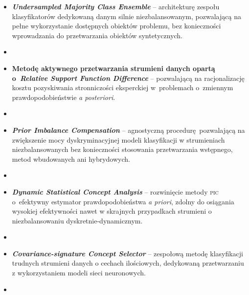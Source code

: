 \begin{itemize}
	\item \textbf{\emph{Undersampled Majority Class Ensemble}} -- architekturę zespołu klasyfikatorów dedykowaną danym silnie niezbalansowanym, pozwalającą na pełne wykorzystanie dostępnych obiektów problemu, bez konieczności wprowadzania do przetwarzania obiektów syntetycznych.
	\item[]\vspace{-.5em} \emph{\color{red}\footnotesize{}}
	
	\item \textbf{Metodę aktywnego przetwarzania strumieni danych opartą o~\emph{Relative Support Function Difference}} -- pozwalającą na racjonalizację kosztu pozyskiwania stronniczości eksperckiej w~problemach o~zmiennym prawdopodobieństwie \emph{a posteriori}.
	\item[]\vspace{-.5em} \emph{\footnotesize\color{red}}
	
	\item \textbf{\emph{Prior Imbalance Compensation}} -- agnostyczną procedurę pozwalającą na zwiększenie mocy dyskryminacyjnej modeli klasyfikacji w strumieniach niezbalansowanych bez konieczności stosowania przetwarzania wstępnego, metod wbudowanych ani hybrydowych.  
	\item[]\vspace{-.5em} \emph{\footnotesize\color{red}}
	
	\item \textbf{\emph{Dynamic Statistical Concept Analysis}} -- rozwinięcie metody \textsc{pic} o~efektywny estymator prawdopodobieństwa \emph{a priori}, zdolny do osiągania wysokiej efektywności nawet w skrajnych przypadkach strumieni o niezbalansowaniu dyskretnie-dynamicznym.
	\item[]\vspace{-.5em} \emph{\footnotesize\color{red}}
	
	\item \textbf{\emph{Covariance-signature Concept Selector}} -- zespołową metodę klasyfikacji trudnych strumieni danych o cechach ilościowych, dedykowaną przetwarzaniu z wykorzystaniem modeli sieci neuronowych.
	\item[]\vspace{-.5em} \emph{\footnotesize\color{red}}
	

\end{itemize}
